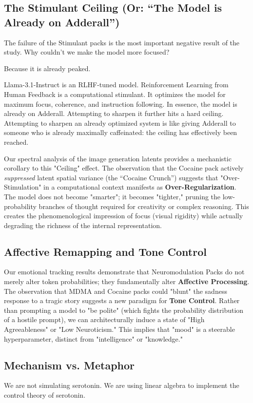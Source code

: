 \documentclass[10pt, twocolumn]{article}
\begin{document}
\subsection{The Stimulant Ceiling (Or: ``The Model is Already on Adderall'')}
The failure of the Stimulant packs is the most important negative result of the study. Why couldn't we make the model more focused?

Because it is already peaked.

Llama-3.1-Instruct is an RLHF-tuned model. Reinforcement Learning from Human Feedback is a computational stimulant. It optimizes the model for maximum focus, coherence, and instruction following. In essence, the model is already on Adderall. Attempting to sharpen it further hits a hard ceiling. Attempting to sharpen an already optimized system is like giving Adderall to someone who is already maximally caffeinated: the ceiling has effectively been reached.

Our spectral analysis of the image generation latents provides a mechanistic corollary to this "Ceiling" effect. The observation that the Cocaine pack actively \textit{suppressed} latent spatial variance (the ``Cocaine Crunch'') suggests that "Over-Stimulation" in a computational context manifests as \textbf{Over-Regularization}. The model does not become "smarter"; it becomes "tighter," pruning the low-probability branches of thought required for creativity or complex reasoning. This creates the phenomenological impression of focus (visual rigidity) while actually degrading the richness of the internal representation.

\subsection{Affective Remapping and Tone Control}
Our emotional tracking results demonstrate that Neuromodulation Packs do not merely alter token probabilities; they fundamentally alter \textbf{Affective Processing}.
The observation that MDMA and Cocaine packs could "blunt" the sadness response to a tragic story suggests a new paradigm for \textbf{Tone Control}. Rather than prompting a model to "be polite" (which fights the probability distribution of a hostile prompt), we can architecturally induce a state of "High Agreeableness" or "Low Neuroticism."
This implies that "mood" is a steerable hyperparameter, distinct from "intelligence" or "knowledge."

\subsection{Mechanism vs. Metaphor}
We are not simulating serotonin. We are using linear algebra to implement the control theory of serotonin.
\end{document}
